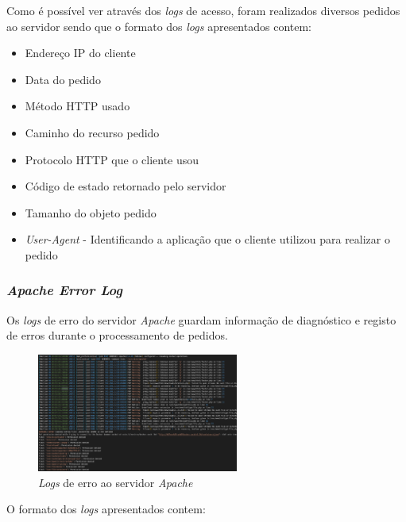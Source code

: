 \documentclass[10pt,english]{article}
\begin{document}
\par Como é possível ver através dos \textit{logs} de acesso, foram realizados diversos pedidos ao servidor sendo que o formato dos \textit{logs} apresentados contem:

\begin{itemize}
    \item Endereço IP do cliente
    \item Data do pedido
    \item Método HTTP usado
    \item Caminho do recurso pedido
    \item Protocolo HTTP que o cliente usou
    \item Código de estado retornado pelo servidor
    \item Tamanho do objeto pedido
    \item \textit{User-Agent} - Identificando a aplicação que o cliente utilizou para realizar o pedido
\end{itemize}

\subsubsection{\textit{Apache Error Log}}

\par Os \textit{logs} de erro do servidor \textit{Apache} guardam informação de diagnóstico e registo de erros durante o processamento de pedidos.

\begin{figure}[h]
    \centering
    \includegraphics[width=250]{images/errorlog.png}
    \caption{\textit{Logs} de erro ao servidor \textit{Apache}}
\end{figure}

\par O formato dos \textit{logs} apresentados contem:
\end{document}
